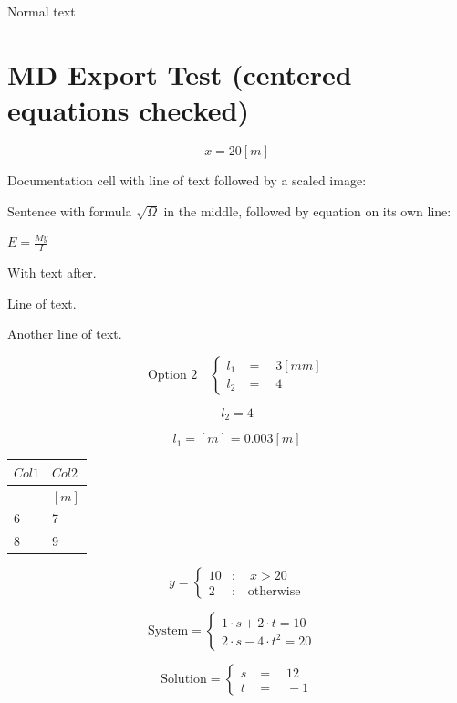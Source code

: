 \documentclass[
  letterpaper,
]{article}
\newcounter{none} %
\begin{document}
Normal text

\section{MD Export Test (centered equations
checked)}\label{md-export-test-centered-equations-checked}

\[ x=20\left\lbrack m\right\rbrack   \]

Documentation cell with line of text followed by a scaled image:

Sentence with formula \(\sqrt{\Omega}\) in the middle, followed by
equation on its own line:

\(E=\frac{My}{I}\)

With text after.

Line of text.

Another line of text.

\[ \text{Option 2} \quad  \begin{cases} l_1 & = \quad 3 \left\lbrack mm\right\rbrack \\ l_2 & = \quad 4  \end{cases} \]

\[ l_2= 4   \]

\[ l_1=\left\lbrack m\right\rbrack =0.003 \left\lbrack m\right\rbrack  \]

{\def\LTcaptype{none} %
\begin{longtable}[]{@{}ll@{}}
\toprule\noalign{}
\(Col1\) & \(Col2\) \\
\midrule\noalign{}
\endhead
\bottomrule\noalign{}
\endlastfoot
& \(\left\lbrack m\right\rbrack\) \\
6 & 7 \\
8 & 9 \\
\end{longtable}
}

\[ y = \begin{cases} 10 &: \quad x>20 \\ 2 &: \quad \text{otherwise} \end{cases} \]

\[ \text{System} = \begin{cases} 1\cdot s+2\cdot t=10 &  \\ 2\cdot s-4\cdot t^2=20 &  \end{cases} \]

\[ \text{Solution} = \begin{cases} s & = \quad 12 \\ t & = \quad -1 \end{cases} \]
\end{document}
